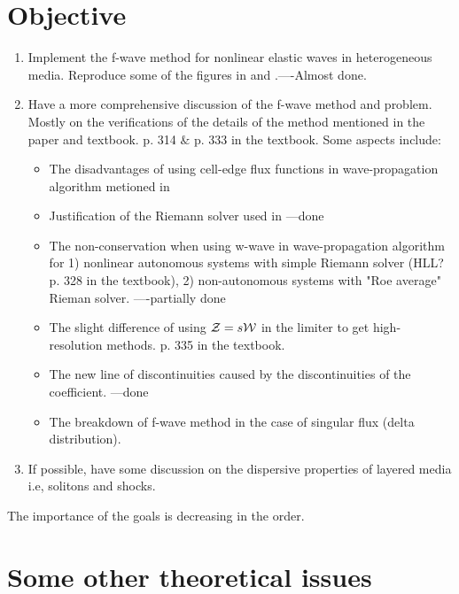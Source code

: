 \documentclass{article}
\begin{document}
\section{Objective}
\begin{enumerate}
\item Implement the f-wave method for nonlinear elastic waves in heterogeneous media. Reproduce some of the figures in \cite{bale2002} \cite{leveque2003} and \cite{ketcheson2012}.----Almost done.
\item Have a more comprehensive discussion of the f-wave method and problem. Mostly on the verifications of the details of the method mentioned in the paper and textbook. p. 314 $\&$ p. 333 in the textbook. Some aspects include:
    \begin{itemize}
    \item The disadvantages of using cell-edge flux functions in wave-propagation algorithm metioned in \cite[p. 957]{bale2002}
    \item Justification of the Riemann solver used in \cite[p. 967]{bale2002}  ---done
    \item The non-conservation when using w-wave in wave-propagation algorithm for 1) nonlinear autonomous systems with simple Riemann solver (HLL? p. 328 in the textbook), 2) non-autonomous systems with "Roe average" Rieman solver.    ----partially done
    \item The slight difference of using $\mathcal{{\cal Z}}=s\mathcal{{\cal W}}$ in the limiter to get high-resolution methods. \cite[p. 964]{bale2002} p. 335 in the textbook.
    \item The new line of discontinuities caused by the discontinuities of the coefficient. \cite[p. 960]{bale2002}   ---done
    \item The breakdown of f-wave method in the case of singular flux (delta distribution).  \cite[p. 961]{bale2002}
    \end{itemize}
\item If possible, have some discussion on the dispersive properties of layered media i.e, solitons and shocks.
\end{enumerate}
The importance of the goals is decreasing in the order.
\section{Some other theoretical issues}
\end{document}
